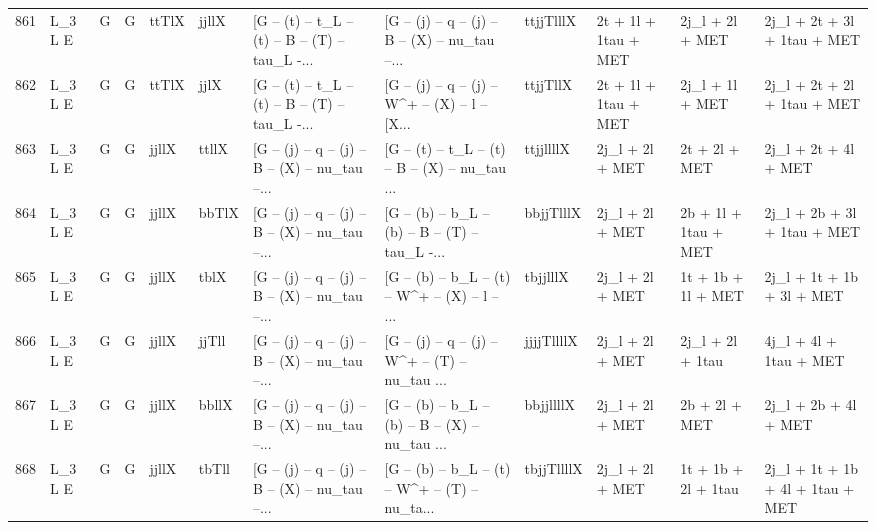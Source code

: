 \begin{tabular}{llllllllllll}
861  &      L\_3 L E &     G &     G &       ttTlX &       jjllX &  [G -- (t) -- t\_L -- (t) -- B -- (T) -- tau\_L -... &  [G -- (j) -- q -- (j) -- B -- (X) -- nu\_tau --... &   ttjjTlllX &     2t + 1l + 1tau + MET &          2j\_l + 2l + MET &        2j\_l + 2t + 3l + 1tau + MET \\
862  &      L\_3 L E &     G &     G &       ttTlX &        jjlX &  [G -- (t) -- t\_L -- (t) -- B -- (T) -- tau\_L -... &  [G -- (j) -- q -- (j) -- W\textasciicircum + -- (X) -- l -- [X... &    ttjjTllX &     2t + 1l + 1tau + MET &          2j\_l + 1l + MET &        2j\_l + 2t + 2l + 1tau + MET \\
863  &      L\_3 L E &     G &     G &       jjllX &       ttllX &  [G -- (j) -- q -- (j) -- B -- (X) -- nu\_tau --... &  [G -- (t) -- t\_L -- (t) -- B -- (X) -- nu\_tau ... &   ttjjllllX &          2j\_l + 2l + MET &            2t + 2l + MET &               2j\_l + 2t + 4l + MET \\
864  &      L\_3 L E &     G &     G &       jjllX &       bbTlX &  [G -- (j) -- q -- (j) -- B -- (X) -- nu\_tau --... &  [G -- (b) -- b\_L -- (b) -- B -- (T) -- tau\_L -... &   bbjjTlllX &          2j\_l + 2l + MET &     2b + 1l + 1tau + MET &        2j\_l + 2b + 3l + 1tau + MET \\
865  &      L\_3 L E &     G &     G &       jjllX &        tblX &  [G -- (j) -- q -- (j) -- B -- (X) -- nu\_tau --... &  [G -- (b) -- b\_L -- (t) -- W\textasciicircum + -- (X) -- l -- ... &    tbjjlllX &          2j\_l + 2l + MET &       1t + 1b + 1l + MET &          2j\_l + 1t + 1b + 3l + MET \\
866  &      L\_3 L E &     G &     G &       jjllX &       jjTll &  [G -- (j) -- q -- (j) -- B -- (X) -- nu\_tau --... &  [G -- (j) -- q -- (j) -- W\textasciicircum + -- (T) -- nu\_tau ... &  jjjjTllllX &          2j\_l + 2l + MET &         2j\_l + 2l + 1tau &             4j\_l + 4l + 1tau + MET \\
867  &      L\_3 L E &     G &     G &       jjllX &       bbllX &  [G -- (j) -- q -- (j) -- B -- (X) -- nu\_tau --... &  [G -- (b) -- b\_L -- (b) -- B -- (X) -- nu\_tau ... &   bbjjllllX &          2j\_l + 2l + MET &            2b + 2l + MET &               2j\_l + 2b + 4l + MET \\
868  &      L\_3 L E &     G &     G &       jjllX &       tbTll &  [G -- (j) -- q -- (j) -- B -- (X) -- nu\_tau --... &  [G -- (b) -- b\_L -- (t) -- W\textasciicircum + -- (T) -- nu\_ta... &  tbjjTllllX &          2j\_l + 2l + MET &      1t + 1b + 2l + 1tau &   2j\_l + 1t + 1b + 4l + 1tau + MET \\

\end{tabular}

